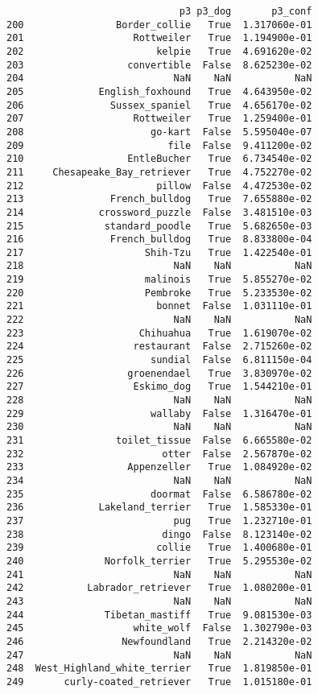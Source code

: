 \documentclass[11pt]{article}
\begin{document}
\begin{verbatim}
                              p3 p3_dog       p3_conf  
200                Border_collie   True  1.317060e-01  
201                   Rottweiler   True  1.194900e-01  
202                       kelpie   True  4.691620e-02  
203                  convertible  False  8.625230e-02  
204                          NaN    NaN           NaN  
205             English_foxhound   True  4.643950e-02  
206               Sussex_spaniel   True  4.656170e-02  
207                   Rottweiler   True  1.259400e-01  
208                      go-kart  False  5.595040e-07  
209                         file  False  9.411200e-02  
210                  EntleBucher   True  6.734540e-02  
211     Chesapeake_Bay_retriever   True  4.752270e-02  
212                       pillow  False  4.472530e-02  
213               French_bulldog   True  7.655880e-02  
214             crossword_puzzle  False  3.481510e-03  
215              standard_poodle   True  5.682650e-03  
216               French_bulldog   True  8.833800e-04  
217                     Shih-Tzu   True  1.422540e-01  
218                          NaN    NaN           NaN  
219                     malinois   True  5.855270e-02  
220                     Pembroke   True  5.233530e-02  
221                       bonnet  False  1.031110e-01  
222                          NaN    NaN           NaN  
223                    Chihuahua   True  1.619070e-02  
224                   restaurant  False  2.715260e-02  
225                      sundial  False  6.811150e-04  
226                  groenendael   True  3.830970e-02  
227                   Eskimo_dog   True  1.544210e-01  
228                          NaN    NaN           NaN  
229                      wallaby  False  1.316470e-01  
230                          NaN    NaN           NaN  
231                toilet_tissue  False  6.665580e-02  
232                        otter  False  2.567870e-02  
233                  Appenzeller   True  1.084920e-02  
234                          NaN    NaN           NaN  
235                      doormat  False  6.586780e-02  
236             Lakeland_terrier   True  1.585330e-01  
237                          pug   True  1.232710e-01  
238                        dingo  False  8.123140e-02  
239                       collie   True  1.400680e-01  
240              Norfolk_terrier   True  5.295530e-02  
241                          NaN    NaN           NaN  
242           Labrador_retriever   True  1.080200e-01  
243                          NaN    NaN           NaN  
244              Tibetan_mastiff   True  9.081530e-03  
245                   white_wolf  False  1.302790e-03  
246                 Newfoundland   True  2.214320e-02  
247                          NaN    NaN           NaN  
248  West_Highland_white_terrier   True  1.819850e-01  
249       curly-coated_retriever   True  1.015180e-01  
    \end{verbatim}
\end{document}
